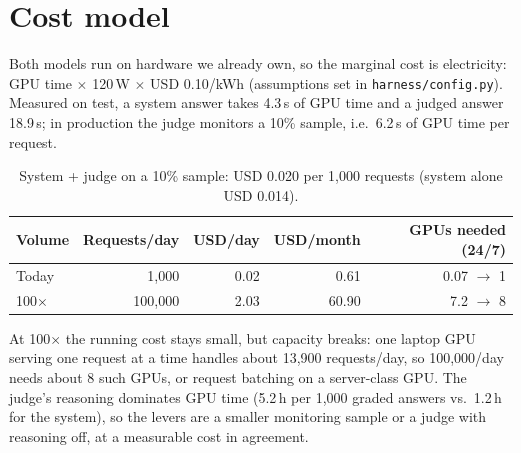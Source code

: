 \documentclass[10pt,a4paper]{article}
\newcommand{\code}[1]{\texttt{#1}}
\begin{document}
\section{Cost model}

Both models run on hardware we already own, so the marginal cost is electricity: GPU time $\times$ 120\,W $\times$ USD 0.10/kWh (assumptions set in \code{harness/config.py}). Measured on test, a system answer takes 4.3\,s of GPU time and a judged answer 18.9\,s; in production the judge monitors a 10\% sample, i.e.\ 6.2\,s of GPU time per request.

\begin{table}[htbp]
\centering\small
\begin{tabular}{@{}lrrrr@{}}
\toprule
Volume & Requests/day & USD/day & USD/month & GPUs needed (24/7) \\
\midrule
Today & 1{,}000 & 0.02 & 0.61 & 0.07 $\to$ 1 \\
100$\times$ & 100{,}000 & 2.03 & 60.90 & 7.2 $\to$ 8 \\
\bottomrule
\end{tabular}
\caption{System + judge on a 10\% sample: USD 0.020 per 1{,}000 requests (system alone USD 0.014).}
\label{tab:cost}
\end{table}

At 100$\times$ the running cost stays small, but capacity breaks: one laptop GPU serving one request at a time handles about 13{,}900 requests/day, so 100{,}000/day needs about 8 such GPUs, or request batching on a server-class GPU. The judge's reasoning dominates GPU time (5.2\,h per 1{,}000 graded answers vs.\ 1.2\,h for the system), so the levers are a smaller monitoring sample or a judge with reasoning off, at a measurable cost in agreement.
\end{document}
